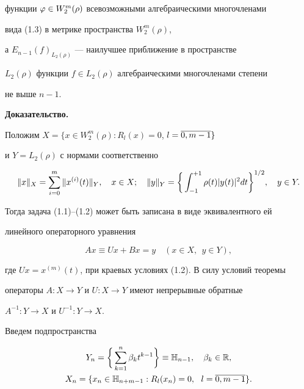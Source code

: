 функции $\varphi\in W_2^m(\rho)$ всевозможными алгебраическими многочленами


вида (1.3) в метрике пространства $W_2^m(\rho)$,


а $E_{n-1}(f)_{L_2(\rho)}$ --- наилучшее приближение в пространстве


$L_2(\rho)$ функции $f\in L_2(\rho)$ алгебраическими многочленами степени 


не выше $n-1$.


\medskip








{\bf Доказательство.}


Положим $X=\{x\in W_2^m(\rho):R_l(x)=0$, $l=\overline{0,m-1}\}$


и $Y=L_2(\rho)$ с нормами соответственно


$$


\|x\|_X = \suml_{i=0}^m\|x^{(i)}(t)\|_Y,\quad x\in X;\quad


\|y\|_Y = \bigg\{\int_{-1}^{+1} \rho(t)|y(t)|^2 dt\bigg\}^{1/2},\quad y\in Y.


$$


Тогда задача (1.1)--(1.2) может быть записана в виде эквивалентного ей 


линейного операторного уравнения


\begin{equation}


Ax\equiv Ux+Bx = y \quad (x\in X,\ \ y\in Y),


\end{equation}


где $Ux=x^{(m)}(t)$, при краевых условиях (1.2). В силу условий теоремы 


операторы $A:X\to Y$ и $U:X\to Y$ имеют непрерывные обратные


$A^{-1}:Y\to X$ и $U^{-1}:Y\to X$.





Введем подпространства


\begin{gather*}


Y_n = \bigg\{\sum_{k=1}^n \beta_k t^{k-1}\bigg\} \equiv


\bH_{n-1},\quad \beta_k\in \R,\\


%


X_n = \{x_n\in \bH_{n+m-1}: R_l(x_n)=0,\ \ l=\ol{0,m-1}\}.


\end{gather*}


